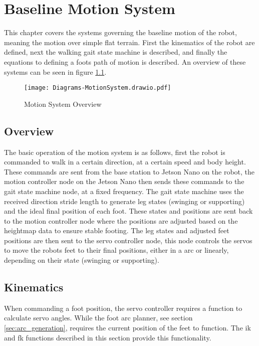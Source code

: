 \chapter{Baseline Motion System} \label{chap:motion}
    This chapter covers the systems governing the baseline motion of the robot, meaning the motion over simple flat terrain. 
    First the kinematics of the robot are defined, next the walking gait state machine is
    described, and finally the equations to defining a foots path of motion is described. An overview of these systems can be seen in figure \ref{fig:motion_system}.
    \begin{figure}[h]
        \centering
        \texttt{[image: Diagrams-MotionSystem.drawio.pdf]}
        \caption{Motion System Overview}
        \label{fig:motion_system}
    \end{figure}
    \section{Overview}
        The basic operation of the motion system is as follows, first the robot is commanded to walk in a certain direction, at a
        certain speed and body height. These commands are sent from the base station to Jetson Nano on the robot,
        the motion controller node on the Jetson Nano then sends these commands to the gait state machine node, at a fixed frequency.
        The gait state machine uses the received direction stride length to generate leg states (swinging or supporting) and the ideal
        final position of each foot. These states and positions are sent back to the motion controller node where the positions are adjusted
        based on the heightmap data to ensure stable footing. The leg states and adjusted feet positions are then sent to the servo 
        controller node, this node controls the servos to move the robots feet to their final positions, either in a arc or linearly,
        depending on their state (swinging or supporting). %

    \section{Kinematics}
        When commanding a foot position, the servo controller requires a function to calculate servo angles. While the foot arc planner, see section 
        \ref{sec:arc_generation}, requires the current position of the feet to function. The \ac{ik} and \ac{fk} functions described in this section provide
        this functionality. 
        

